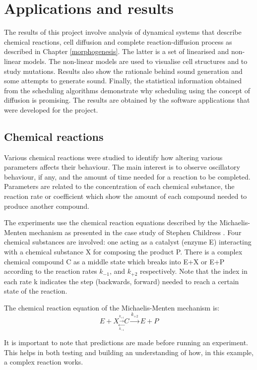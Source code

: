 \chapter{Applications and results}
\label{results}
The results of this project involve analysis of dynamical systems that describe chemical reactions, cell diffusion and complete  reaction-diffusion process as described in Chapter \ref{morphogenesis}. The latter is a set of linearised and non-linear models. The non-linear models are used to visualise cell structures and to study mutations. Results also show the rationale behind sound generation and some attempts to generate sound. Finally, the statistical information obtained from the scheduling algorithms demonstrate why scheduling using the concept of diffusion is promising. The results are obtained by the software applications that were developed for the project.
	\section{Chemical reactions}
Various chemical reactions were studied to identify how altering various parameters affects their behaviour. The main interest is to observe oscillatory behaviour, if any, and the amount of time needed for a reaction to be completed. Parameters are related to the concentration of each chemical substance, the reaction rate or coefficient which show the amount of each compound needed to produce another compound. 

    The experiments use the chemical reaction equations described by the Michaelis-Menten mechanism as presented in the case study of Stephen Childress \cite{childress_case_2005}. Four chemical substances are involved: one acting as a catalyst (enzyme E) interacting with a chemical substance X for composing the product P. There is a complex chemical compound C as a middle state which breaks into E+X or E+P according to the reaction rates $ k_{-1} $, and $ k_{+2} $ respectively. Note that the index in each rate k indicates the step (backwards, forward) needed to reach a certain state of the reaction.

The chemical reaction equation of the Michaelis-Menten mechanism is:
\begin{equation}
\label{excheq}
 E + X \underset{\underset{k_{-1}} \gets}{\overset{\overset{k_{+1}} \to}{}}  
		 C \overset{k_{+2}} \to E + P
\end{equation}

It is important to note that predictions are made before running an experiment. This helps in both testing and building an understanding of how, in this example, a complex reaction works.

